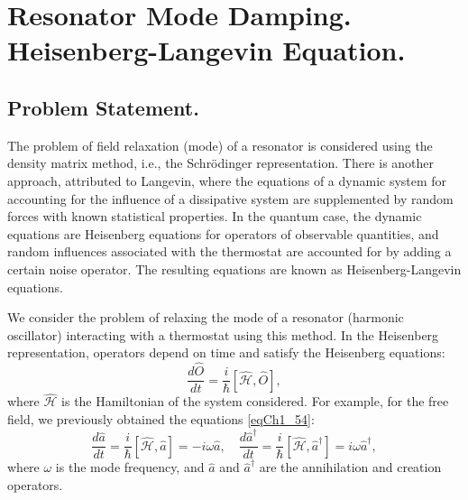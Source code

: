 \section{Resonator Mode Damping. Heisenberg-Langevin Equation.}

\subsection{Problem Statement.}
The problem of field relaxation (mode) of a resonator is considered using the density matrix method, i.e., the Schrödinger representation. There is another approach, attributed to Langevin, where the equations of a dynamic system for accounting for the influence of a dissipative system are supplemented by random forces with known statistical properties. In the quantum case, the dynamic equations are Heisenberg equations for operators of observable quantities, and random influences associated with the thermostat are accounted for by adding a certain noise operator. The resulting equations are known as Heisenberg-Langevin equations.

We consider the problem of relaxing the mode of a resonator (harmonic oscillator) interacting with a thermostat using this method. In the Heisenberg representation, operators depend on time and satisfy the Heisenberg equations:
\begin{equation}
\frac{d \hat{O}}{dt} = \frac{i}{\hbar}
\left[\hat{\mathcal{H}}, \hat{O}\right],
\nonumber
\end{equation}
where $\hat{\mathcal{H}}$ is the Hamiltonian of the system considered. For example, for the free field, we previously obtained the equations \eqref{eqCh1_54}:
\begin{equation}
\frac{d \hat{a}}{d t} = \frac{i}{\hbar}\left[\hat{\mathcal{H}},
  \hat{a}\right] = -i \omega \hat{a}, \quad
\frac{d \hat{a}^{\dag}}{dt} = \frac{i}{\hbar}\left[\hat{\mathcal{H}},
  \hat{a}^{\dag}\right] = i \omega \hat{a}^{\dag},
\nonumber
\end{equation}
where $\omega$ is the mode frequency, and $\hat{a}$ and $\hat{a}^{\dag}$ are the annihilation and creation operators.



